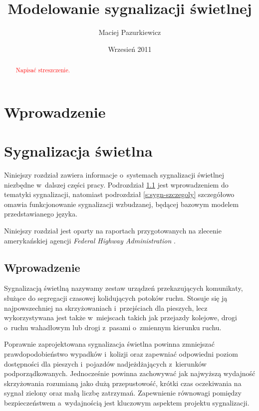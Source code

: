 \documentclass{pracamgr}
\author{Maciej Pazurkiewicz}
\title{Modelowanie sygnalizacji świetlnej}
\date{Wrzesień 2011}
\newcommand{\todo}[1]{\textcolor{red}{#1}}
\theoremstyle{plain}
\begin{document}
\maketitle

\begin{abstract}
  \todo{Napisać streszczenie.}
\end{abstract}

\tableofcontents

\chapter*{Wprowadzenie} 

\chapter{Sygnalizacja świetlna}
\label{c:sygnalizacja}

Niniejszy rozdział zawiera informacje o~systemach sygnalizacji
świetlnej niezbędne w~dalszej części pracy. Podrozdział
\ref{s:sygn-wprowadzenie} jest wprowadzeniem do tematyki sygnalizacji,
natomiast podrozdział \ref{s:sygn-szczegoly} szczegółowo omawia
funkcjonowanie sygnalizacji wzbudzanej, będącej bazowym modelem
przedstawianego języka.

Niniejszy rozdział jest oparty na raportach przygotowanych na zlecenie
amerykańskiej agencji \emph{Federal Highway Administration}
\cite{fhwa:handbook06} \cite{fhwa:timing08}.

\section{Wprowadzenie}
\label{s:sygn-wprowadzenie}

Sygnalizacją świetlną nazywamy zestaw urządzeń przekazujących
komunikaty, służące do segregacji czasowej kolidujących potoków
ruchu. Stosuje się ją najpowszechniej na skrzyżowaniach i~przejściach
dla pieszych, lecz wykorzystywana jest także w~miejscach takich jak
przejazdy kolejowe, drogi o~ruchu wahadłowym lub drogi z~pasami
o~zmiennym kierunku ruchu.

Poprawnie zaprojektowana sygnalizacja świetlna powinna zmniejszać
prawdopodobieństwo wypadków i~kolizji oraz zapewniać odpowiedni poziom
dostępności dla pieszych i~pojazdów nadjeżdżających z~kierunków
podporządkowanych. Jednocześnie powinna zachowywać jak najwyższą
wydajność skrzyżowania rozumianą jako dużą przepustowość, krótki
czas oczekiwania na sygnał zielony oraz małą liczbę
zatrzymań. Zapewnienie równowagi pomiędzy bezpieczeństwem a~wydajnością
jest kluczowym aspektem projektu sygnalizacji.
\end{document}
